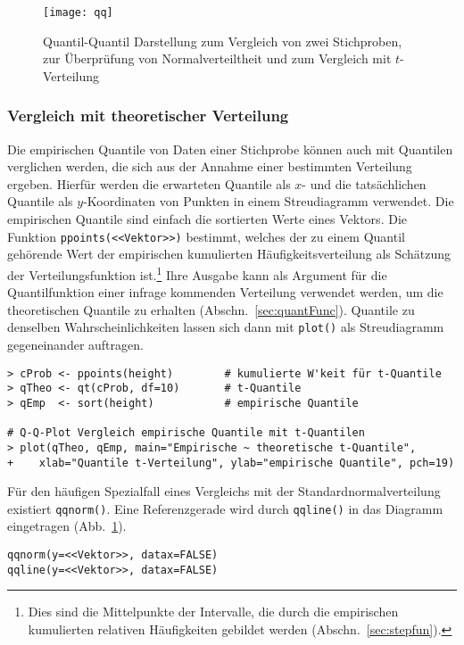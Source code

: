 \begin{figure}[ht]
\centering
\texttt{[image: qq]}
\vspace*{-0.5em}
\caption{Quantil-Quantil Darstellung zum Vergleich von zwei Stichproben, zur Überprüfung von Normalverteiltheit und zum Vergleich mit $t$-Verteilung}
\label{fig:qq}
\end{figure}

\subsubsection{Vergleich mit theoretischer Verteilung}

Die empirischen Quantile von Daten einer Stichprobe können auch mit Quantilen verglichen werden, die sich aus der Annahme einer bestimmten Verteilung ergeben. Hierfür werden die erwarteten Quantile als $x$- und die tatsächlichen Quantile als $y$-Koordinaten von Punkten in einem Streudiagramm verwendet. Die empirischen Quantile sind einfach die sortierten Werte eines Vektors. Die Funktion \lstinline!ppoints(<<Vektor>>)! bestimmt, welches der zu einem Quantil gehörende Wert der empirischen kumulierten Häufigkeitsverteilung als Schätzung der Verteilungsfunktion ist.\footnote{Dies sind die Mittelpunkte der Intervalle, die durch die empirischen kumulierten relativen Häufigkeiten gebildet werden (Abschn.\ \ref{sec:stepfun}).} Ihre Ausgabe kann als Argument für die Quantilfunktion einer infrage kommenden Verteilung verwendet werden, um die theoretischen Quantile zu erhalten (Abschn.\ \ref{sec:quantFunc}). Quantile zu denselben Wahrscheinlichkeiten lassen sich dann mit \lstinline!plot()! als Streudiagramm gegeneinander auftragen.
\begin{lstlisting}
> cProb <- ppoints(height)        # kumulierte W'keit für t-Quantile
> qTheo <- qt(cProb, df=10)       # t-Quantile
> qEmp  <- sort(height)           # empirische Quantile

# Q-Q-Plot Vergleich empirische Quantile mit t-Quantilen
> plot(qTheo, qEmp, main="Empirische ~ theoretische t-Quantile",
+    xlab="Quantile t-Verteilung", ylab="empirische Quantile", pch=19)
\end{lstlisting}

Für den häufigen Spezialfall eines Vergleichs mit der Standardnormalverteilung existiert \lstinline!qqnorm()!. Eine Referenzgerade wird durch \lstinline!qqline()! in das Diagramm eingetragen (Abb.\ \ref{fig:qq}).
\begin{lstlisting}
qqnorm(y=<<Vektor>>, datax=FALSE)
qqline(y=<<Vektor>>, datax=FALSE)
\end{lstlisting}

